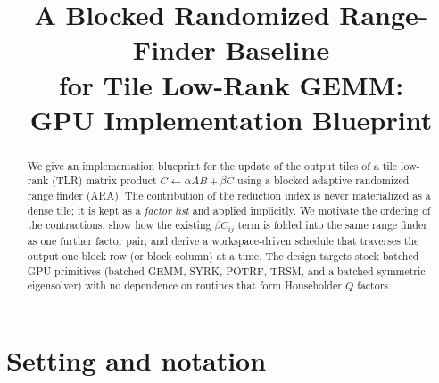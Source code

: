 \documentclass[11pt]{article}
\title{A Blocked Randomized Range-Finder Baseline\\
for Tile Low-Rank GEMM:\\
GPU Implementation Blueprint}
\author{}
\date{}
\begin{document}
\maketitle

\begin{abstract}
We give an implementation blueprint for the update of the output tiles of a tile
low-rank (TLR) matrix product $C\leftarrow\alpha AB+\beta C$ using a blocked
adaptive randomized range finder (ARA). The contribution of the reduction index
is never materialized as a dense tile; it is kept as a \emph{factor list} and
applied implicitly. We motivate the ordering of the contractions, show how the
existing $\beta C_{ij}$ term is folded into the same range finder as one further
factor pair, and derive a workspace-driven schedule that traverses the output
one block row (or block column) at a time. The design targets stock batched
GPU primitives (batched GEMM, SYRK, POTRF, TRSM, and a batched symmetric
eigensolver) with no dependence on routines that form Householder $Q$ factors.
\end{abstract}

\tableofcontents

\section{Setting and notation}
\label{sec:setting}
\end{document}

